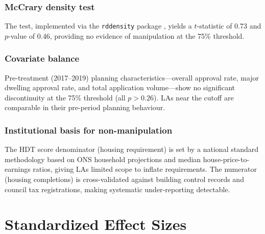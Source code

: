 \documentclass[12pt]{article}
\begin{document}
\subsubsection*{McCrary density test} The \citet{mccrary2008} test, implemented via the \texttt{rddensity} package \citep{cattaneo2020rddensity}, yields a $t$-statistic of 0.73 and $p$-value of 0.46, providing no evidence of manipulation at the 75\% threshold.

\subsubsection*{Covariate balance} Pre-treatment (2017--2019) planning characteristics---overall approval rate, major dwelling approval rate, and total application volume---show no significant discontinuity at the 75\% threshold (all $p > 0.26$). LAs near the cutoff are comparable in their pre-period planning behaviour.

\subsubsection*{Institutional basis for non-manipulation} The HDT score denominator (housing requirement) is set by a national standard methodology based on ONS household projections and median house-price-to-earnings ratios, giving LAs limited scope to inflate requirements. The numerator (housing completions) is cross-validated against building control records and council tax registrations, making systematic under-reporting detectable.


\section{Standardized Effect Sizes}
\label{sec:sde}


\end{document}
